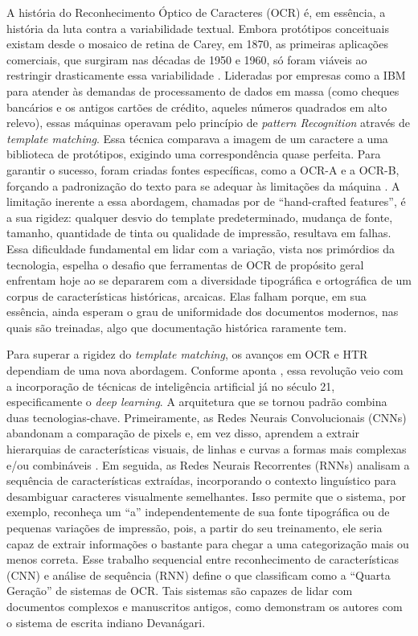 \documentclass[portuguese]{textolivre}
\begin{document}
A história do Reconhecimento Óptico de Caracteres (OCR) é, em essência, a história da luta contra a variabilidade textual. Embora protótipos conceituais existam desde o mosaico de retina de Carey, em 1870, as primeiras aplicações comerciais, que surgiram nas décadas de 1950 e 1960, só foram viáveis ao restringir drasticamente essa variabilidade \cite{wang2023ocr,narang2021ancient}. Lideradas por empresas como a IBM para atender às demandas de processamento de dados em massa (como cheques bancários e os antigos cartões de crédito, aqueles números quadrados em alto relevo), essas máquinas operavam pelo princípio de \textit{pattern Recognition }através de \textit{template matching}. Essa técnica comparava a imagem de um caractere a uma biblioteca de protótipos, exigindo uma correspondência quase perfeita. Para garantir o sucesso, foram criadas fontes específicas, como a OCR-A e a OCR-B, forçando a padronização do texto para se adequar às limitações da máquina \cite[p.~4]{narang2021ancient}. A limitação inerente a essa abordagem, chamadas por \textcite[p.~6]{wang2021object} de “hand-crafted features”, é a sua rigidez: qualquer desvio do template predeterminado, mudança de fonte, tamanho, quantidade de tinta ou qualidade de impressão, resultava em falhas. Essa dificuldade fundamental em lidar com a variação, vista nos primórdios da tecnologia, espelha o desafio que ferramentas de OCR de propósito geral enfrentam hoje ao se depararem com a diversidade tipográfica e ortográfica de um corpus de características históricas, arcaicas. Elas falham porque, em sua essência, ainda esperam o grau de uniformidade dos documentos modernos, nas quais são treinadas, algo que documentação histórica raramente tem.

Para superar a rigidez do \textit{template matching}, os avanços em OCR e HTR dependiam de uma nova abordagem. Conforme aponta \textcite{wang2023ocr}, essa revolução veio com a incorporação de técnicas de inteligência artificial já no século 21, especificamente o \textit{deep learning}. A arquitetura que se tornou padrão combina duas tecnologias-chave. Primeiramente, as Redes Neurais Convolucionais (CNNs) abandonam a comparação de pixels e, em vez disso, aprendem a extrair hierarquias de características visuais, de linhas e curvas a formas mais complexas e/ou combináveis \cite[p.~7]{wang2021object}. Em seguida, as Redes Neurais Recorrentes (RNNs) analisam a sequência de características extraídas, incorporando o contexto linguístico para desambiguar caracteres visualmente semelhantes. Isso permite que o sistema, por exemplo, reconheça um “a” independentemente de sua fonte tipográfica ou de pequenas variações de impressão, pois, a partir do seu treinamento, ele seria capaz de extrair informações o bastante para chegar a uma categorização mais ou menos correta. Esse trabalho sequencial entre reconhecimento de características (CNN) e análise de sequência (RNN) define o que \textcite{narang2021ancient} classificam como a “Quarta Geração” de sistemas de OCR. Tais sistemas são capazes de lidar com documentos complexos e manuscritos antigos, como demonstram os autores com o sistema de escrita indiano Devanágari.
\end{document}
